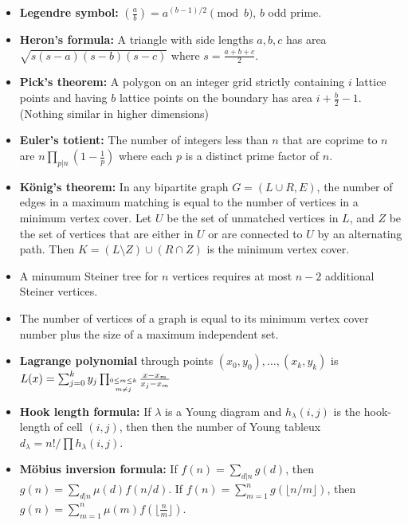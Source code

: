 \documentclass[8pt,a4paper,landscape,oneside]{amsart}
\begin{document}
\begin{multicols*}{3}
        \begin{itemize}[leftmargin=*]
            \item \textbf{Legendre symbol:} $\left(\frac{a}{b}\right) = a^{(b-1)/2} \pmod{b}$, $b$ odd prime.
            \item \textbf{Heron's formula:} A triangle with side lengths
                $a,b,c$ has area $\sqrt{s(s-a)(s-b)(s-c)}$ where $s =
                \frac{a+b+c}{2}$.
            \item \textbf{Pick's theorem:} A polygon on an integer grid
                strictly containing $i$ lattice points and having $b$ lattice
                points on the boundary has area $i + \frac{b}{2} - 1$. (Nothing
                similar in higher dimensions)
            \item \textbf{Euler's totient:} The number of integers less than
                $n$ that are coprime to $n$ are $n\prod_{p|n}\left(1 - \frac{1}{p}\right)$
                where each $p$ is a distinct prime factor of $n$.
            \item \textbf{König's theorem:} In any bipartite graph $G=(L\cup R,E)$, the number
                of edges in a maximum matching is equal to the number of
                vertices in a minimum vertex cover. Let $U$ be the set of
                unmatched vertices in $L$, and $Z$ be the set of vertices that
                are either in $U$ or are connected to $U$ by an alternating
                path. Then $K=(L\setminus Z)\cup(R\cap Z)$ is the minimum
                vertex cover.
            \item A minumum Steiner tree for $n$ vertices requires at most $n-2$ additional Steiner vertices.
            \item The number of vertices of a graph is equal to its minimum
                vertex cover number plus the size of a maximum independent set.
            \item \textbf{Lagrange polynomial} through points $(x_0,y_0),\ldots,(x_k,y_k)$ is $L(x) = \sum_{j=0}^k y_j \prod_{\shortstack{$\scriptscriptstyle 0\leq m \leq k$ \\ $\scriptscriptstyle m\neq j$}} \frac{x-x_m}{x_j - x_m}$
            \item \textbf{Hook length formula:} If $\lambda$ is a Young diagram and $h_{\lambda}(i,j)$ is the hook-length of cell $(i,j)$, then then the number of Young tableux $d_{\lambda} = n!/\prod h_{\lambda}(i,j)$.
            \item \textbf{Möbius inversion formula:} If $f(n) = \sum_{d|n} g(d)$, then $g(n) = \sum_{d|n} \mu(d) f(n/d)$. If $f(n) = \sum_{m=1}^n g(\lfloor n/m\rfloor)$, then $g(n) = \sum_{m=1}^n \mu(m)f(\lfloor\frac{n}{m}\rfloor)$.

\end{itemize}
\end{multicols*}
\end{document}

